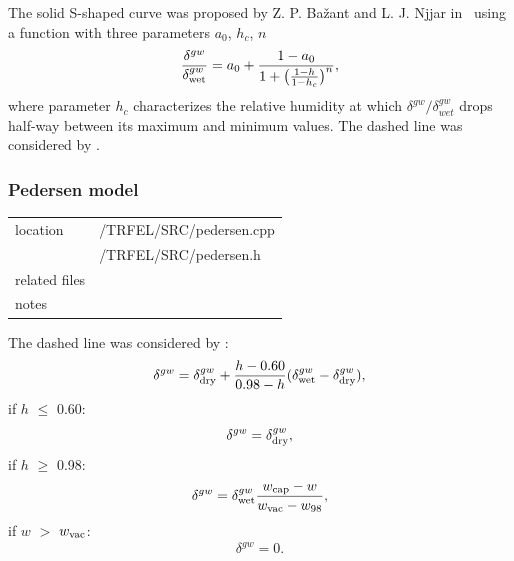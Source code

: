 The solid S-shaped curve was proposed by Z. P. Ba\v{z}ant and L. J. Njjar in~\cite{bazant_n} using a function 
with three parameters $a_0$, $h_c$, $n$
\begin{equation}
\frac{\delta^{gw}}{\delta_{\rm wet}^{gw}} = a_0 + \frac{1 -a_0}{1 + \big(\frac{1 - h}{1 - h_c}\big)^n},
\end{equation}
where parameter $h_c$ characterizes the relative humidity at which $\delta^{gw}/\delta_{wet}^{gw}$ drops half-way between 
its maximum and minimum values. The dashed line was considered by \cite{pedersen}.


\subsubsection{Pedersen model}

\begin{center}
\begin{tabular}{|l|l|}
\hline
location & /TRFEL/SRC/pedersen.cpp\\
         & /TRFEL/SRC/pedersen.h
\\ \hline
related files &
\\ \hline
notes & 
\\ \hline
\end{tabular}
\end{center}

The dashed line was considered by \cite{pedersen}:
\begin{equation}
\delta^{gw} = \delta^{gw}_{\rm dry} + \frac{h-0.60}{0.98-h}(\delta^{gw}_{\rm wet} - \delta^{gw}_{\rm dry}),\nonumber
\end{equation}
if $h$ $\leq$ 0.60:
\begin{equation}
\delta^{gw} = \delta^{gw}_{\rm dry},\nonumber
\end{equation}
if $h$ $\geq$ 0.98:
\begin{equation}
\delta^{gw} = \delta^{gw}_{\rm wet}\frac{w_{\rm cap} - w}{w_{\rm vac} - w_{98}},\nonumber
\end{equation}
if $w$ $>$ $w_{\rm vac}$:
\begin{equation}
\delta^{gw} = 0.\nonumber
\end{equation}